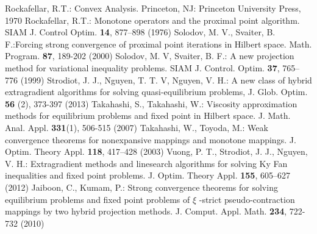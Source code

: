 \documentclass{aims}
\theoremstyle{definition}
\begin{document}
\begin{thebibliography}{99}
 Rockafellar, R.T.: Convex Analysis. Princeton, NJ: Princeton University Press, 1970
Rockafellar, R.T.: Monotone operators and the proximal point algorithm. SIAM J. Control Optim. \textbf{14}, 877--898 (1976)
Solodov, M. V., Svaiter, B. F.:Forcing strong convergence of proximal point iterations in Hilbert space. Math. Program. 
\textbf{87}, 189-202 (2000)
Solodov, M. V, Svaiter, B. F.: A new projection method for variational inequality problems. SIAM
J. Control. Optim. \textbf{37}, 765--776 (1999)
Strodiot, J. J., Nguyen, T. T. V, Nguyen, V. H.: A new class of hybrid extragradient algorithms
for solving quasi-equilibrium problems, J. Glob. Optim. \textbf{56} (2), 373-397 (2013)
Takahashi, S., Takahashi, W.: Viscosity approximation methods for equilibrium problems and fixed point in 
Hilbert space. J. Math. Anal. Appl. \textbf{331}(1), 506-515 (2007)
 Takahashi, W., Toyoda, M.: Weak convergence theorems for nonexpansive mappings and
monotone mappings. J. Optim. Theory Appl. \textbf{118}, 417--428 (2003)
Vuong, P. T., Strodiot, J. J., Nguyen, V. H.: Extragradient methods and linesearch algorithms
for solving Ky Fan inequalities and fixed point
problems. J. Optim. Theory Appl. \textbf{155}, 605--627 (2012)
 Jaiboon, C., Kumam, P.: Strong convergence theorems for solving equilibrium problems and
fixed point problems of $\xi$ -strict pseudo-contraction mappings by two
hybrid projection methods. J. Comput. Appl. Math. \textbf{234}, 722-732 (2010)
\end{thebibliography}
\end{document}
